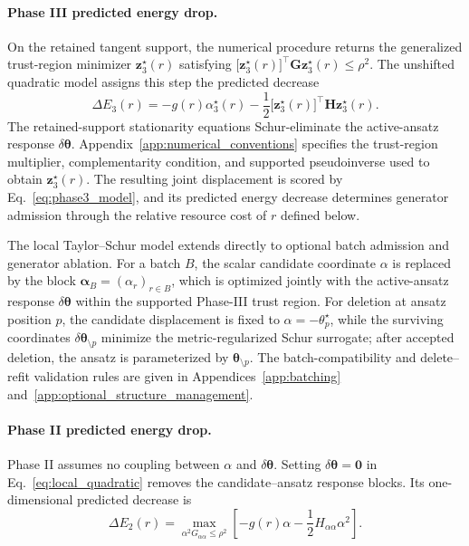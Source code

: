 \documentclass[
  reprint,
  amsmath,
  amssymb,
  aps,
  pra,
  nofootinbib,
  superscriptaddress,
  floatfix
]{revtex4-2}
\begin{document}
\paragraph*{Phase III predicted energy drop.}
On the retained tangent support, the numerical procedure returns the
generalized trust-region minimizer \(\mathbf z_3^\star(r)\) satisfying
\(\bigl[\mathbf z_3^\star(r)\bigr]^\top
\mathbf G\mathbf z_3^\star(r)\le\rho^2\).
The unshifted quadratic model assigns this step the predicted decrease
\begin{equation}
\Delta E_3(r)
=-g(r)\alpha_3^\star(r)
-\frac12\bigl[\mathbf z_3^\star(r)\bigr]^\top
\mathbf H\mathbf z_3^\star(r) .
\label{eq:phase3_model}
\end{equation}
The retained-support stationarity equations Schur-eliminate the active-ansatz
response \(\delta\boldsymbol\theta\).
Appendix~\ref{app:numerical_conventions} specifies the trust-region multiplier,
complementarity condition, and supported pseudoinverse used to obtain
\(\mathbf z_3^\star(r)\). The resulting
joint displacement is scored by Eq.~\eqref{eq:phase3_model}, and its predicted
energy decrease determines generator admission through the relative resource
cost of \(r\) defined below.

The local Taylor--Schur model extends directly to optional batch admission and
generator ablation. For a batch \(B\), the scalar candidate coordinate \(\alpha\) is
replaced by the block
\(\boldsymbol\alpha_B=(\alpha_r)_{r\in B}\), which is optimized jointly with
the active-ansatz response \(\delta\boldsymbol\theta\) within the supported
Phase-III trust region. For deletion at ansatz position \(p\), the candidate
displacement is fixed to \(\alpha=-\theta_p^\star\), while the surviving
coordinates \(\delta\boldsymbol\theta_{\setminus p}\) minimize the
metric-regularized Schur surrogate; after accepted deletion,
the ansatz is parameterized by \(\boldsymbol\theta_{\setminus p}\). The
batch-compatibility and delete--refit validation rules are given in
Appendices~\ref{app:batching} and~\ref{app:optional_structure_management}.

\paragraph*{Phase II predicted energy drop.}
Phase II assumes no coupling between \(\alpha\) and
\(\delta\boldsymbol{\theta}\). Setting
\(\delta\boldsymbol\theta=\mathbf 0\) in
Eq.~\eqref{eq:local_quadratic} removes the candidate--ansatz response blocks.
Its one-dimensional predicted decrease is
\begin{equation}
\Delta E_2(r)=
\max_{\alpha^2G_{\alpha\alpha}\le\rho^2}
\left[
-g(r)\alpha
-\frac12H_{\alpha\alpha}\alpha^2
\right].
\label{eq:phase2_gain}
\end{equation}
\end{document}
